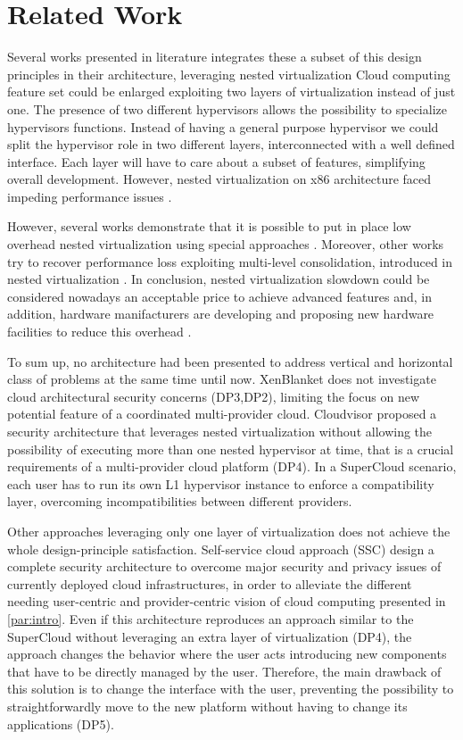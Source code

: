 \documentclass{sig-alternate}
\begin{document}
\section{Related Work}
\label{sec:rw}
Several works presented in literature integrates these a subset of this design principles in their architecture, leveraging nested virtualization \cite{turtle:ibm,art:blan, cloudvisor:zhang}
Cloud computing feature set could be enlarged exploiting two layers of virtualization instead of just one. The presence of two different hypervisors allows the possibility to specialize hypervisors functions. Instead of having a general purpose hypervisor we could split the hypervisor role in two different layers, interconnected with a well defined interface.
Each layer will have to care about a subset of features, simplifying overall development.
However, nested virtualization on x86 architecture faced impeding performance issues \cite{rec:virt}.

However, several works demonstrate that it is possible to put in place low overhead nested virtualization using special approaches \cite{turtle:ibm} . Moreover, other works try to recover performance loss exploiting multi-level consolidation, introduced in nested virtualization \cite{art:blan}. In conclusion, nested virtualization slowdown could be considered nowadays an acceptable price to achieve advanced features and, in addition, hardware manifacturers are developing and proposing new hardware facilities to reduce this overhead \cite{vmcs:nakajima}.

To sum up, no architecture had been presented to address vertical and horizontal class of problems at the same time until now. XenBlanket does not investigate cloud architectural security concerns (DP3,DP2), limiting the focus on new potential feature of a coordinated multi-provider cloud. Cloudvisor proposed a security architecture that leverages nested virtualization without allowing the possibility of executing more than one nested hypervisor at time, that is a crucial requirements of a multi-provider cloud platform (DP4). In a SuperCloud scenario, each user has to run its own L1 hypervisor instance to enforce a compatibility layer, overcoming incompatibilities between different providers.

Other approaches leveraging only one layer of virtualization does not achieve the whole design-principle satisfaction. Self-service cloud approach (SSC) \cite{ssc:art} design a complete security architecture to overcome major security and privacy issues of currently deployed cloud infrastructures, in order to alleviate the different needing user-centric and provider-centric vision of cloud computing presented in \ref{par:intro}. Even if this architecture reproduces an approach similar to the SuperCloud without leveraging an extra layer of virtualization (DP4), the approach changes the behavior where the user acts introducing new components that have to be directly managed by the user. Therefore, the main drawback of this solution is to change the interface with the user, preventing the possibility to straightforwardly move to the new platform without having to change its applications (DP5).
\end{document}
